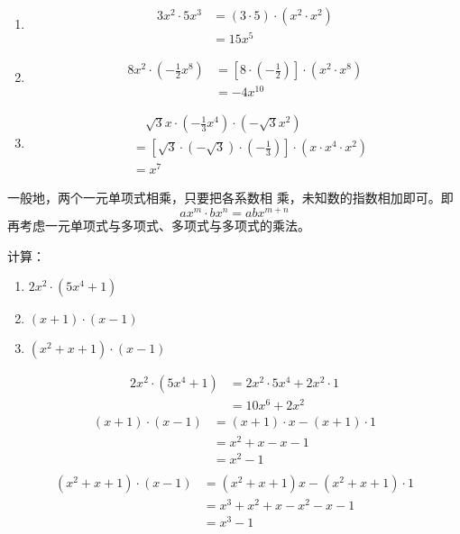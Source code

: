 \begin{solution}
\begin{enumerate}
    \item \begin{align*}
        3x^2\cdot 5x^3&=(3\cdot 5)\cdot (x^2\cdot x^2)\tag{交换、结合律}\\
        &=15x^5
    \end{align*}
    \item \begin{align*}
        8x^2\cdot \left(-\frac{1}{2}x^8\right)&=\left[8\cdot \left(-\frac{1}{2}\right)\right]\cdot (x^2\cdot x^8)\\
        &=-4x^{10}
    \end{align*}
    \item \begin{align*}
      &\quad   \sqrt{3}x\cdot \left(-\frac{1}{3}x^4\right)\cdot \left(-\sqrt{3}x^2\right)\\      
      &= \left[\sqrt{3}\cdot \left(-\sqrt{3}\right)\cdot \left(-\frac{1}{3}\right)\right]\cdot (x\cdot x^4\cdot x^2)\\
      &=x^7 
    \end{align*}   
\end{enumerate} 
\end{solution}

一般地，两个一元单项式相乘，只要把各系数相
乘，未知数的指数相加即可。即
\[ ax^m\cdot bx^n =abx^{m+n}\]
再考虑一元单项式与多项式、多项式与多项式的乘法。

\begin{example}
    计算：
    \begin{enumerate}
        \item $2x^2\cdot (5x^4+1)$
        \item $(x+1)\cdot (x-1)$
        \item $(x^2+x+1)\cdot (x-1)$
    \end{enumerate}   
\end{example}

\begin{solution}
\begin{align*}
    2x^2\cdot (5x^4+1)&=2x^2\cdot 5x^4+ 2x^2\cdot 1\tag{分配律}\\
    &=10x^6+2x^2
\end{align*}
\begin{align*}
    (x+1)\cdot (x-1)&=(x+1)\cdot x-  (x+1)\cdot 1 \tag{分配律}\\
    &=x^2+x-x-1  \tag{分配律}\\
    &=x^2-1 \tag{合并同类项}\\
\end{align*}   
\begin{align*}
    (x^2+x+1)\cdot (x-1)&=(x^2+x+1)x-(x^2+x+1)\cdot 1\\
    &=x^3+x^2+x-x^2-x-1\\
    &=x^3-1
\end{align*}
\end{solution}

